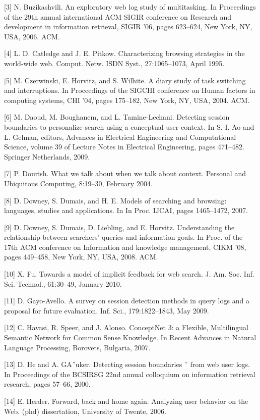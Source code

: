\documentclass{acm_proc_article-sp} %
\begin{document}
[3] N. Buzikashvili. An exploratory web log study of
multitasking. In Proceedings of the 29th annual
international ACM SIGIR conference on Research and
development in information retrieval, SIGIR ’06, pages
623–624, New York, NY, USA, 2006. ACM.

[4] L. D. Catledge and J. E. Pitkow. Characterizing
browsing strategies in the world-wide web. Comput.
Netw. ISDN Syst., 27:1065–1073, April 1995.

[5] M. Czerwinski, E. Horvitz, and S. Wilhite. A diary
study of task switching and interruptions. In
Proceedings of the SIGCHI conference on Human
factors in computing systems, CHI ’04, pages 175–182,
New York, NY, USA, 2004. ACM.

[6] M. Daoud, M. Boughanem, and L. Tamine-Lechani.
Detecting session boundaries to personalize search
using a conceptual user context. In S.-I. Ao and
L. Gelman, editors, Advances in Electrical Engineering
and Computational Science, volume 39 of Lecture
Notes in Electrical Engineering, pages 471–482.
Springer Netherlands, 2009.

[7] P. Dourish. What we talk about when we talk about
context. Personal and Ubiquitous Computing, 8:19–30,
February 2004.

[8] D. Downey, S. Dumais, and H. E. Models of searching
and browsing: languages, studies and applications. In
In Proc. IJCAI, pages 1465–1472, 2007.

[9] D. Downey, S. Dumais, D. Liebling, and E. Horvitz.
Understanding the relationship between searchers’
queries and information goals. In Proc. of the 17th
ACM conference on Information and knowledge
management, CIKM ’08, pages 449–458, New York,
NY, USA, 2008. ACM.

[10] X. Fu. Towards a model of implicit feedback for web
search. J. Am. Soc. Inf. Sci. Technol., 61:30–49,
January 2010.

[11] D. Gayo-Avello. A survey on session detection
methods in query logs and a proposal for future
evaluation. Inf. Sci., 179:1822–1843, May 2009.

[12] C. Havasi, R. Speer, and J. Alonso. ConceptNet 3: a
Flexible, Multilingual Semantic Network for Common
Sense Knowledge. In Recent Advances in Natural
Language Processing, Borovets, Bulgaria, 2007.

[13] D. He and A. GA˝uker. Detecting session boundaries ˜
from web user logs. In Proceedings of the BCSIRSG
22nd annual colloquium on information retrieval
research, pages 57–66, 2000.

[14] E. Herder. Forward, back and home again. Analyzing
user behavior on the Web. (phd) dissertation,
University of Twente, 2006.
\end{document}
